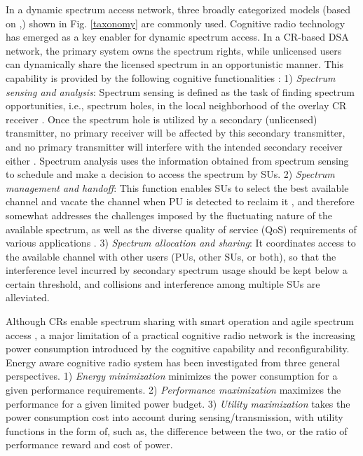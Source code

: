 \documentclass[journal,12pt,onecolumn]{IEEEtran}
\begin{document}
In a dynamic spectrum access network, three broadly categorized models (based on \cite{threestrategies},\cite{4221550}) shown in Fig. \ref{taxonomy} are commonly used. Cognitive radio technology has emerged as a key enabler for dynamic spectrum access. In a CR-based DSA network, the primary system owns the spectrum rights, while unlicensed users can dynamically share the licensed spectrum in an opportunistic manner. This capability is provided by the following cognitive functionalities \cite{Func}: 1) \emph{Spectrum sensing and analysis}: Spectrum sensing is defined as the task of finding spectrum opportunities, i.e., spectrum holes, in the local neighborhood of the overlay CR receiver \cite{SS}. Once the spectrum hole is utilized by a secondary (unlicensed) transmitter, no primary receiver will be affected by this secondary transmitter, and no primary transmitter will interfere with the intended secondary receiver either \cite{specrumHole1}. Spectrum analysis uses the information obtained from spectrum sensing to schedule and make a decision to access the spectrum by SUs. 2) \emph{Spectrum management and handoff}: This function enables SUs to select the best available channel and vacate the channel when PU is detected to reclaim it \cite{HO}, and therefore somewhat addresses the challenges imposed by the fluctuating nature of the available spectrum, as well as the diverse quality of service (QoS) requirements of various applications \cite{SM}. 3) \emph{Spectrum allocation and sharing}: It coordinates access to the available channel with other users (PUs, other SUs, or both), so that the interference level incurred by secondary spectrum usage should be kept below a certain threshold, and collisions and interference among multiple SUs are alleviated.

Although CRs enable spectrum sharing with smart operation and agile spectrum access \cite{greenCRINTRODUCTION}, a major limitation of a practical cognitive radio network is the increasing power consumption introduced by the cognitive capability and reconfigurability. Energy aware cognitive radio system has been investigated from three general perspectives. 1) \emph{Energy minimization} minimizes the power consumption for a given performance requirements. 2) \emph{Performance maximization} maximizes the performance for a given limited power budget. 3) \emph{Utility maximization} takes the power consumption cost into account during sensing/transmission, with utility functions in the form of, such as, the difference between the two, or the ratio of performance reward and cost of power.
\end{document}
